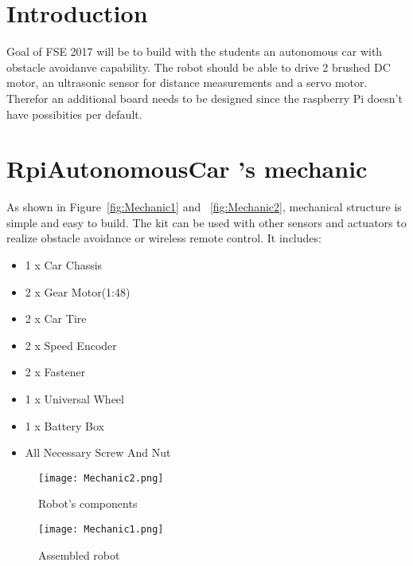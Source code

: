 \documentclass[
12pt, %
a4paper, %
oneside, %
headinclude,footinclude, %
BCOR5mm, %
]{scrartcl}
\begin{document}
%
\newpage
%


\section{Introduction}
Goal of FSE 2017 will be to build with the students an autonomous car with obstacle avoidanve capability. The robot should be able to drive 2 brushed DC motor, an ultrasonic sensor for distance measurements and a servo motor. Therefor an additional board needs to be designed since the raspberry Pi doesn't have possibities per default.


\section{RpiAutonomousCar 's mechanic}
As shown in Figure~\vref{fig:Mechanic1} and ~\vref{fig:Mechanic2}, mechanical structure is simple and easy to build. The kit can be used with other sensors and actuators to realize obstacle avoidance or wireless remote control. It includes:
\begin{itemize}
\item 1 x Car Chassis 
\item 2 x Gear Motor(1:48) 
\item 2 x Car Tire 
\item 2 x Speed Encoder 
\item 2 x Fastener 
\item 1 x Universal Wheel 
\item 1 x Battery Box 
\item All Necessary Screw And Nut
\end{itemize}

\begin{figure}[!htb]
  \texttt{[image: Mechanic2.png]}
  \caption{Robot's components}\label{fig:Mechanic2}
\endminipage\hfill
{}
  \texttt{[image: Mechanic1.png]}
  \caption{Assembled robot}\label{fig:Mechanic1}
\endminipage
\end{figure}
\end{document}

